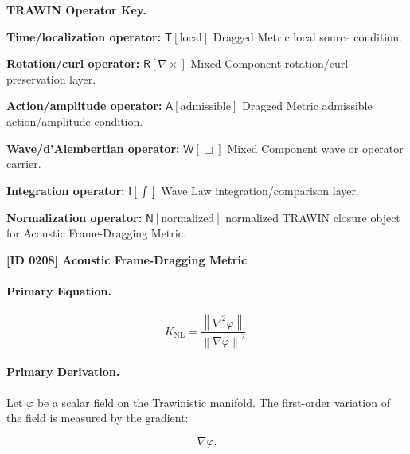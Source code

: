 \par\vspace{0.45\baselineskip}
\noindent\begin{minipage}[t]{\linewidth}
\begingroup
\small
\raggedright
\textbf{TRAWIN Operator Key.}\par
\noindent\textbf{Time/localization operator:} $\mathsf{T}\!\left[\mathrm{local}\right]$ Dragged Metric local source condition.\par
\noindent\textbf{Rotation/curl operator:} $\mathsf{R}\!\left[\nabla\times\right]$ Mixed Component rotation/curl preservation layer.\par
\noindent\textbf{Action/amplitude operator:} $\mathsf{A}\!\left[\mathrm{admissible}\right]$ Dragged Metric admissible action/amplitude condition.\par
\noindent\textbf{Wave/d'Alembertian operator:} $\mathsf{W}\!\left[\Box\right]$ Mixed Component wave or operator carrier.\par
\noindent\textbf{Integration operator:} $\mathsf{I}\!\left[\int\right]$ Wave Law integration/comparison layer.\par
\noindent\textbf{Normalization operator:} $\mathsf{N}\!\left[\mathrm{normalized}\right]$ normalized TRAWIN closure object for Acoustic Frame-Dragging Metric.\par
\endgroup
\end{minipage}

\clearpage
\noindent\textbf{[ID 0208] Acoustic Frame-Dragging Metric}\par
\vspace{0.35em}
\paragraph{Primary Equation.}
\begin{equation}
K_{\mathrm{NL}}
=
\frac{\left\lVert \nabla^{2}\varphi\right\rVert}
{\left\lVert \nabla\varphi\right\rVert^{2}} .
\end{equation}

\paragraph{Primary Derivation.}
Let $\varphi$ be a scalar field on the Trawinistic manifold.  
The first-order variation of the field is measured by the gradient:

\begin{equation}
\nabla\varphi .
\end{equation}

